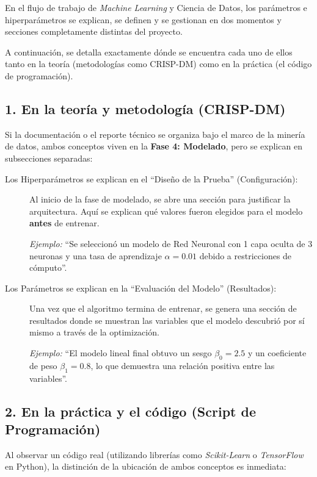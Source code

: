 En el flujo de trabajo de \textit{Machine Learning} y Ciencia de Datos, los parámetros e hiperparámetros se explican, se definen y se gestionan en dos momentos y secciones completamente distintas del proyecto. 

A continuación, se detalla exactamente dónde se encuentra cada uno de ellos tanto en la teoría (metodologías como CRISP-DM) como en la práctica (el código de programación).

\subsection{1. En la teoría y metodología (CRISP-DM)}
Si la documentación o el reporte técnico se organiza bajo el marco de la minería de datos, ambos conceptos viven en la \textbf{Fase 4: Modelado}, pero se explican en subsecciones separadas:

\begin{description}
    \item[Los Hiperparámetros se explican en el ``Diseño de la Prueba'' (Configuración):] Al inicio de la fase de modelado, se abre una sección para justificar la arquitectura. Aquí se explican qué valores fueron elegidos para el modelo \textbf{antes} de entrenar. 
    
    \textit{Ejemplo:} ``Se seleccionó un modelo de Red Neuronal con 1 capa oculta de 3 neuronas y una tasa de aprendizaje $\alpha = 0.01$ debido a restricciones de cómputo''.
    
    \item[Los Parámetros se explican en la ``Evaluación del Modelo'' (Resultados):] Una vez que el algoritmo termina de entrenar, se genera una sección de resultados donde se muestran las variables que el modelo descubrió por sí mismo a través de la optimización.
    
    \textit{Ejemplo:} ``El modelo lineal final obtuvo un sesgo $\beta_0 = 2.5$ y un coeficiente de peso $\beta_1 = 0.8$, lo que demuestra una relación positiva entre las variables''.
\end{description}

\subsection{2. En la práctica y el código (Script de Programación)}
Al observar un código real (utilizando librerías como \textit{Scikit-Learn} o \textit{TensorFlow} en Python), la distinción de la ubicación de ambos conceptos es inmediata:


